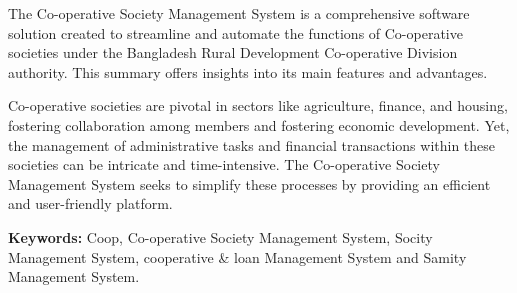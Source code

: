 The Co-operative Society Management System is a comprehensive software solution created to streamline and automate the functions of Co-operative societies under the Bangladesh Rural Development Co-operative Division authority. This summary offers insights into its main features and advantages.

Co-operative societies are pivotal in sectors like agriculture, finance, and housing, fostering collaboration among members and fostering economic development. Yet, the management of administrative tasks and financial transactions within these societies can be intricate and time-intensive. The Co-operative Society Management System seeks to simplify these processes by providing an efficient and user-friendly platform.






\vspace{8pt}
\textbf{Keywords:} Coop, Co-operative Society Management
System, Socity Management System, cooperative & loan Management System and Samity Management System. 
